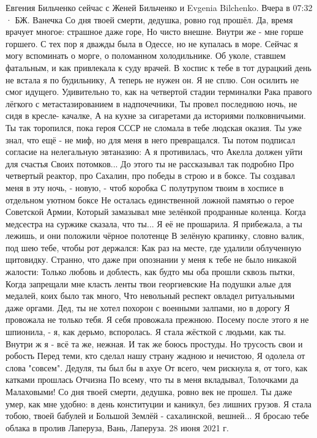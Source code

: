 \documentclass[a4paper,11pt]{extreport}
\begin{document}
Евгения Бильченко сейчас с Женей Бильченко и Evgenia Bilchenko.
Вчера в 07:32 ·
БЖ. Ванечка
Со дня твоей смерти, дедушка, ровно год прошёл.
Да, время врачует многое: страшное даже горе,
Но чисто внешне. Внутри же - мне горше горшего.
С тех пор я дважды была в Одессе, но не купалась в море.
Сейчас я могу вспоминать о морге, о поломанном холодильнике.
Об уколе, ставшем фатальным, и как привлекала к суду врачей.
В хоспис к тебе в тот дурацкий день не встала я по будильнику,
А теперь не нужен он. Я не сплю. Сон осилить не смог идущего.
Удивительно то, как на четвертой стадии терминалки
Рака правого лёгкого с метастазированием в надпочечники,
Ты провел последнюю ночь, не сидя в кресле- качалке,
А на кухне за сигаретами да историями полковничьими.
Ты так торопился, пока героя СССР не сломала в тебе людская оказия.
Ты уже знал, что ещё - не миф, но для меня в него превращался.
Ты потом подписал согласие на нелегальную эвтаназию:
А я противилась, что Акелла должен уйти для счастья
Своих потомков... До этого ты не рассказывал так подробно
Про четвертый реактор, про Сахалин, про победы в строю и в боксе.
Ты создавал меня в эту ночь, - новую, - чтоб коробка
С полутрупом твоим в хосписе в отдельном уютном боксе
Не осталась единственной ложной памятью о герое Советской Армии,
Который замазывал мне зелёнкой продранные коленца.
Когда медсестра на суржике сказала, что ты...
Я её не прошарила.
Я прибежала, а ты лежишь, и они положили чёрное полотенце
В зелёную крапинку, словно валик, под шею тебе, чтобы рот держался:
Как раз на месте, где удалили облученную щитовидку.
Странно, что даже при опознании у меня к тебе не было никакой жалости:
Только любовь и доблесть, как будто мы оба прошли сквозь пытки,
Когда запрещали мне класть ленты твои георгиевские
На подушки алые для медалей, коих было так много,
Что невольный респект овладел ритуальными даже оргами.
Дед, ты не хотел похорон с военными залпами, но в дорогу
Я провожала не только тебя. Я себя провожала прежнюю.
Посему после этого я не шпионила, - я, как дерьмо, вспоролась.
Я стала жёсткой с людьми, как ты. Внутри ж я - всё та же, нежная.
И так же боюсь простуды. Но трусость свои и робость
Перед теми, кто сделал нашу страну жадною и нечистою,
Я одолела от слова "совсем". Дедуля, ты был бы в ахуе
От всего, чем рискнула я, от того, как катками прошлась Отчизна
По всему, что ты в меня вкладывал, Толочками да Малаховыми!
Со дня твоей смерти, дедушка, ровно век не прошел.
Ты даже умер, как мне удобно: в день конституции и каникул, без лишних грузов.
Я стала тобою, твоей бабулей и Большой Землёй - сахалинской, вешней...
Я бросаю тебе облака в пролив Лаперуза,
Вань, Лаперуза.
28 июня 2021 г.
\end{document}
